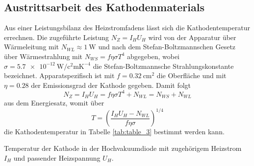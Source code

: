 \subsection{Austrittsarbeit des Kathodenmaterials}

Aus einer Leistungsbilanz des Heizstromfadens lässt sich die Kathodentemperatur errechnen. Die zugeführte Leistung
$N_Z = I_H U_H$ wird von der Apparatur über Wärmeleitung mit $N_{WL} \approx \qty{1}{\watt}$ und nach dem
Stefan-Boltzmannschen Gesetz über Wärmestrahlung mit $N_{WS} = f \eta \sigma T^4$ abgegeben, wobei
$\sigma = \qty{5.7e-12}{\watt\per\square\centi\meter\kelvin\tothe{-4}}$ die Stefan-Boltzmannsche
Strahlungskonstante bezeichnet. Apparatspezifisch ist mit $f = \qty{0.32}{\centi\meter\squared}$ die Oberfläche und mit
$\eta = \num{0.28}$ der Emissionsgrad der Kathode gegeben. Damit folgt
\begin{equation*}
	N_Z = I_H U_H = f \eta \sigma T^4 + N_{WL} = N_{WS} + N_{WL}
\end{equation*}
aus dem Energiesatz, womit über
\begin{equation*}
	T = \left( \frac{I_H U_H - N_{WL}}{f \eta \sigma} \right)^{\!\! 1/4}
\end{equation*}
die Kathodentemperatur in Tabelle \ref{tab:table_3} bestimmt werden kann.
\begin{table}[H]
	\caption{Temperatur der Kathode in der Hochvakuumdiode mit zugehörigem Heizstrom $I_H$ und passender Heizspannung $U_H$.}
	\centering
	
	\label{tab:table_3}
\end{table}




